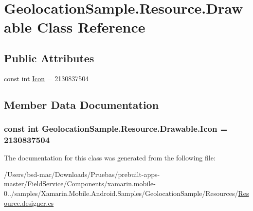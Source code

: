 \hypertarget{class_geolocation_sample_1_1_resource_1_1_drawable}{\section{Geolocation\+Sample.\+Resource.\+Drawable Class Reference}
\label{class_geolocation_sample_1_1_resource_1_1_drawable}
}
\subsection*{Public Attributes}
\begin{DoxyCompactItemize}
\item 
const int \hyperlink{class_geolocation_sample_1_1_resource_1_1_drawable_abae9dea592c50a86b890a56720b844f8}{Icon} = 2130837504
\end{DoxyCompactItemize}


\subsection{Member Data Documentation}
\hypertarget{class_geolocation_sample_1_1_resource_1_1_drawable_abae9dea592c50a86b890a56720b844f8}{
\subsubsection[{Icon}]{\setlength{\rightskip}{0pt plus 5cm}const int Geolocation\+Sample.\+Resource.\+Drawable.\+Icon = 2130837504}}\label{class_geolocation_sample_1_1_resource_1_1_drawable_abae9dea592c50a86b890a56720b844f8}


The documentation for this class was generated from the following file\+:\begin{DoxyCompactItemize}
\item 
/\+Users/bsd-\/mac/\+Downloads/\+Pruebas/prebuilt-\/apps-\/master/\+Field\+Service/\+Components/xamarin.\+mobile-\/0../samples/\+Xamarin.\+Mobile.\+Android.\+Samples/\+Geolocation\+Sample/\+Resources/\hyperlink{_components_2xamarin_8mobile-0_86_81_2samples_2_xamarin_8_mobile_8_android_8_samples_2_geolocati70c310c330f4a850881b004033a4fa1f}{Resource.\+designer.\+cs}\end{DoxyCompactItemize}
